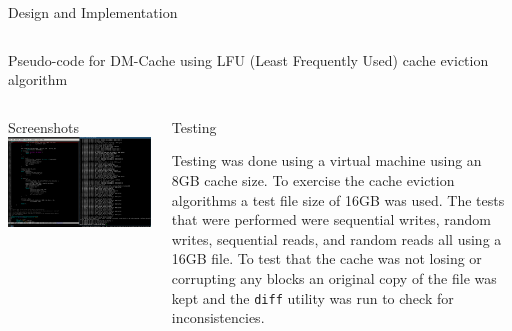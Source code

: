 \documentclass[final,12pt]{beamer}
\begin{document}
\begin{frame}{}
\begin{block}{\large Design and Implementation}
\begin{columns}
      \begin{column}{.33\textwidth}
        

        \centering \small Pseudo-code for DM-Cache using LFU (Least Frequently
        Used) cache eviction algorithm
      \end{column}

      \begin{column}{.33\textwidth}
      \end{column}

    \end{columns}

  \end{block}

  \begin{columns}

    \begin{column}{.5\linewidth}
      \begin{block}{\large Screenshots}
        \centering
        \includegraphics[width=.97\textwidth]{../images/screenshot.png}
      \end{block}
    \end{column}

    \begin{column}{.5\linewidth}
      \begin{block}{\large Testing}

        Testing was done using a virtual machine using an 8GB cache size. To
        exercise the cache eviction algorithms a test file size of 16GB was
        used. The tests that were performed were sequential writes, random
        writes, sequential reads, and random reads all using a 16GB file. To
        test that the cache was not losing or corrupting any blocks an original
        copy of the file was kept and the \texttt{diff} utility was run to check
        for inconsistencies.


\end{block}
\end{column}
\end{columns}
\end{frame}
\end{document}
